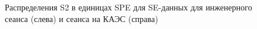 \begin{figure}[ht]
  \begin{minipage}[ht]{0.49\linewidth}    
  \end{minipage}
  \hfill
  \begin{minipage}[ht]{0.49\linewidth}  
  \end{minipage}
  \caption{Распределения S2 в единицах SPE для SE-данных для инженерного сеанса (слева) и сеанса на КАЭС (справа)}
  \label{img:sespesp}  
\end{figure}

